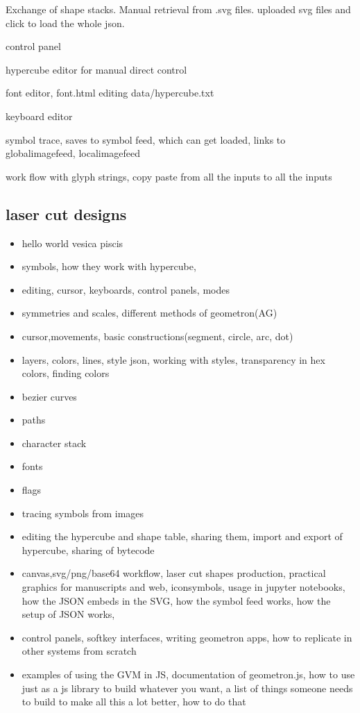 Exchange of shape stacks. Manual retrieval from .svg files.  uploaded svg files and click to load the whole json.

control panel

hypercube editor for manual direct control

font editor, font.html editing data/hypercube.txt


keyboard editor

symbol trace, saves to symbol feed, which can get loaded, links to globalimagefeed, localimagefeed

work flow with glyph strings, copy paste from all the inputs to all the inputs

\subsection{laser cut designs}

\begin{itemize}
\tightlist
\item
hello world vesica piscis
\item
symbols, how they work with hypercube, 
\item
editing, cursor, keyboards, control panels, modes
\item
symmetries and scales, different methods of geometron(AG)
\item
cursor,movements, basic constructions(segment, circle, arc, dot)
\item
layers, colors, lines, style json, working with styles, transparency in hex colors, finding colors
\item
bezier curves
\item
paths
\item
character stack
\item
fonts
\item
flags
\item
tracing symbols from images
\item
editing the hypercube and shape table, sharing them, import and export of hypercube, sharing of bytecode
\item
canvas,svg/png/base64 workflow, laser cut shapes production, practical graphics for manuscripts and web, iconsymbols, usage in jupyter notebooks, how the JSON embeds in the SVG, how the symbol feed works, how the setup of JSON works,
\item
control panels, softkey interfaces, writing geometron apps, how to replicate in other systems from scratch
\item
examples of using the GVM in JS, documentation of geometron.js, how to use just as a js library to build whatever you want, a list of things someone needs to build to make all this a lot better, how to do that
\end{itemize}